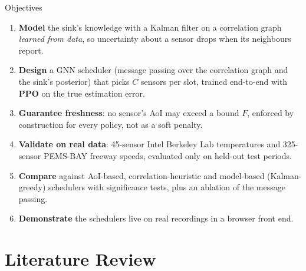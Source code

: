 \documentclass[aspectratio=169,10pt,xcolor=table]{beamer}
\begin{document}
\begin{frame}{Objectives}
  \begin{enumerate}\setlength\itemsep{0.6em}
    \item \textbf{Model} the sink's knowledge with a Kalman filter on a correlation graph
          \emph{learned from data}, so uncertainty about a sensor drops when its neighbours report.
    \item \textbf{Design} a GNN scheduler (message passing over the correlation graph and the sink's
          posterior) that picks $C$ sensors per slot, trained end-to-end with \textbf{PPO} on the true
          estimation error.
    \item \textbf{Guarantee freshness}: no sensor's AoI may exceed a bound $F$, enforced by
          construction for every policy, not as a soft penalty.
    \item \textbf{Validate on real data}: 45-sensor Intel Berkeley Lab temperatures and 325-sensor
          PEMS-BAY freeway speeds, evaluated only on held-out test periods.
    \item \textbf{Compare} against AoI-based, correlation-heuristic and model-based (Kalman-greedy)
          schedulers with significance tests, plus an ablation of the message passing.
    \item \textbf{Demonstrate} the schedulers live on real recordings in a browser front end.
  \end{enumerate}
\end{frame}

\section{Literature Review}
\end{document}
